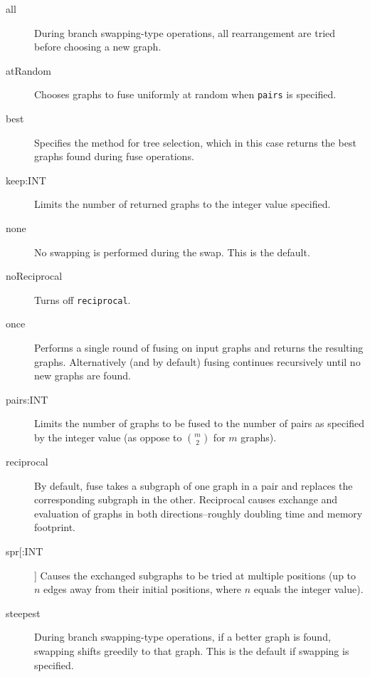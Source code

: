 	\begin{description}
		\item [all]  During branch swapping-type operations, all rearrangement are tried before 
		choosing a new graph. 
		
		
		\item [atRandom] Chooses graphs to fuse uniformly at random when \texttt{pairs} is specified. 
		
		\item [best] Specifies the method for tree selection, which in this case returns the best graphs 
		found during fuse operations.		
		
		\item [keep:INT] Limits the number of returned graphs to the integer value specified. 
		
		\item [none] No swapping is performed during the swap. This is the default.
		
		\item [noReciprocal] Turns off \texttt{reciprocal}.
		
		\item [once] Performs a single round of fusing on input graphs and returns the resulting graphs. 
		Alternatively (and by default) fusing continues recursively until no new graphs are found.
		
		\item [pairs:INT] Limits the number of graphs to be fused to the number of pairs as 
		specified by the integer value (as oppose to $\binom{m}{2}$ for $m$ graphs).
		
		\item [reciprocal] By default, fuse takes a subgraph of one graph in a pair and replaces the 
		corresponding subgraph in the other.  Reciprocal causes exchange and evaluation of graphs 
		in both directions--roughly doubling time and memory footprint.
		
		\item [spr[:INT]] Causes the exchanged subgraphs to be tried at multiple positions (up to 
		$n$ edges away from their initial positions, where $n$ equals the integer value).
		
		\item [steepest] During branch swapping-type operations, if a better graph is found, swapping 
		shifts greedily to that graph. This is the default if swapping is specified.
		

\end{description}
